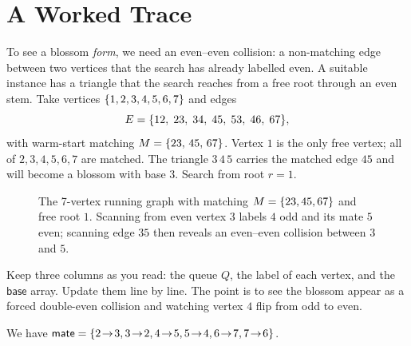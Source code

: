\section{A Worked Trace}

To see a blossom \emph{form}, we need an even--even collision: a non-matching edge between two
vertices that the search has already labelled even. A suitable instance has a triangle that the
search reaches from a free root through an even stem. Take vertices $\{1,2,3,4,5,6,7\}$ and edges
\[
E=\{12,\;23,\;34,\;45,\;53,\;46,\;67\},
\]
with warm-start matching $M=\{23,\,45,\,67\}$. Vertex $1$ is the only free vertex; all of
$2,3,4,5,6,7$ are matched. The triangle $3\,4\,5$ carries the matched edge $45$ and will become a
blossom with base $3$. Search from root $r=1$.

\begin{figure}[H]
\centering
{}
\caption{The 7-vertex running graph with matching $M=\{23, 45, 67\}$ and free root $1$. Scanning from even vertex $3$ labels $4$ odd and its mate $5$ even; scanning edge $35$ then reveals an even--even collision between $3$ and $5$.}
\label{ch17:fig-blossom-trace-init}
\end{figure}

\begin{labbox}
Keep three columns as you read: the queue $Q$, the label of each vertex, and the $\textsf{base}$
array. Update them line by line. The point is to see the blossom appear as a forced double-even
collision and watching vertex $4$ flip from odd to even.
\end{labbox}

We have $\textsf{mate}=\set{2\!\to\!3,3\!\to\!2,4\!\to\!5,5\!\to\!4,6\!\to\!7,7\!\to\!6}$.

